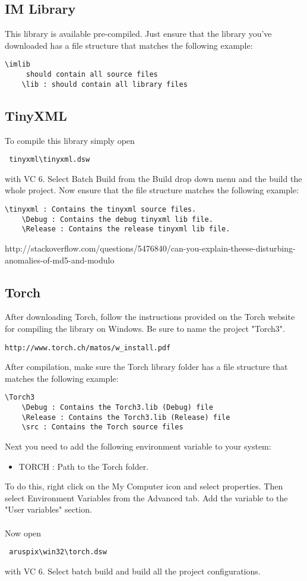 \documentclass[]{article}
\begin{document}
\subsection{IM Library}

This library is available pre-compiled. Just ensure that the library you've
downloaded has a file structure that matches the following example:
\begin{verbatim}
\imlib
     should contain all source files
    \lib : should contain all library files
\end{verbatim}
 
\subsection{TinyXML}

To compile this library simply open \begin{verbatim} tinyxml\tinyxml.dsw \end{verbatim}
with VC 6. Select Batch Build from the Build drop down menu and the build the
whole project. Now ensure that the file structure matches the following example:
\begin{verbatim}
\tinyxml : Contains the tinyxml source files.
    \Debug : Contains the debug tinyxml lib file.
    \Release : Contains the release tinyxml lib file.
\end{verbatim}http://stackoverflow.com/questions/5476840/can-you-explain-theese-disturbing-anomalies-of-md5-and-modulo
	
\subsection{Torch}

After downloading Torch, follow the instructions provided on the Torch website
for compiling the library on Windows. Be sure to name the project "Torch3".
\begin{verbatim}http://www.torch.ch/matos/w_install.pdf \end{verbatim}
After compilation, make sure the Torch library folder has a file structure
that matches the following example:
\begin{verbatim}
\Torch3
    \Debug : Contains the Torch3.lib (Debug) file
    \Release : Contains the Torch3.lib (Release) file
    \src : Contains the Torch source files
\end{verbatim}
Next you need to add the following environment variable to your system: 
\begin{itemize}
	\item TORCH : Path to the Torch folder. 
\end{itemize}
To do this, right click on the My Computer icon and select properties. Then
select Environment Variables from the Advanced tab. Add the variable to the
"User variables" section.\\\\
Now open \begin{verbatim} aruspix\win32\torch.dsw \end{verbatim} with VC 6.
Select batch build and build all the project configurations.
  
\end{document}
